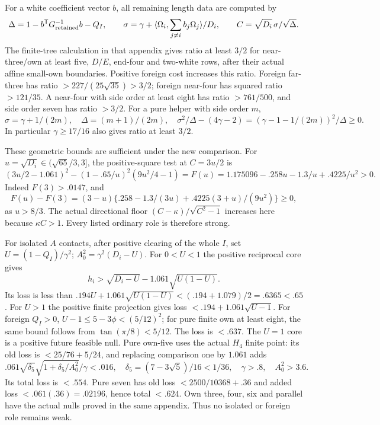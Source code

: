 \documentclass[11pt]{article}
\theoremstyle{definition}
\theoremstyle{remark}
\newcommand{\ip}[2]{\langle #1,#2\rangle}
\begin{document}
For a white coefficient vector \(b\), all remaining length data
are computed by
\[
 \Delta=1-b^\mathsf TG_{\rm retained}^{-1}b-Q_I,\qquad
 \sigma=\gamma+
  \ip{\Omega_i}{\sum_{j\ne i}b_j\Omega_j}/D_i,\qquad
 C=\sqrt{D_i}\,\sigma/\sqrt\Delta .
\]
The finite-tree calculation in that appendix gives ratio at least
\(3/2\) for near-three/own at least five, \(D/E\), end-four and
two-white rows, after their actual affine small-own boundaries.
Positive foreign cost increases this ratio.
Foreign far-three has ratio \(>227/(25\sqrt{35})>3/2\);
foreign near-four has squared ratio \(>121/35\).
A near-four with side order at least eight has ratio \(>761/500\),
and side order seven has ratio \(>3/2\).
For a pure helper with side order \(m\),
\[
 \sigma=\gamma+1/(2m),\quad \Delta=(m+1)/(2m),\quad
 \sigma^2/\Delta-(4\gamma-2)
 =(\gamma-1-1/(2m))^2/\Delta\geq0 .
\]
In particular \(\gamma\geq17/16\) also gives ratio at least \(3/2\).

These geometric bounds are sufficient under the new comparison.
For \(u=\sqrt{D_i}\in(\sqrt{65}/3,3]\), the positive-square test at
\(C=3u/2\) is
\[
 (3u/2-1.061)^2-(1-.65/u)^2(9u^2/4-1)
 =F(u)=1.175096-.258u-1.3/u+.4225/u^2>0 .
\]
Indeed \(F(3)>.0147\), and
\[
 F(u)-F(3)=(3-u)
 \{.258-1.3/(3u)+.4225(3+u)/(9u^2)\}\geq0,
\]
as \(u>8/3\). The actual directional floor
\((C-\kappa)/\sqrt{C^2-1}\) increases here because \(\kappa C>1\).
Every listed ordinary role is therefore strong.

For isolated \(A\) contacts, after positive clearing of the whole
\(I\), set \(U=(1-Q_I)/\gamma^2\);
\(A_0^2=\gamma^2(D_i-U)\).
For \(0<U<1\) the positive reciprocal core gives
\[
 h_i>\sqrt{D_i-U}-1.061\sqrt{U(1-U)}.
\]
Its loss is less than
\(.194U+1.061\sqrt{U(1-U)}
 <(.194+1.079)/2=.6365<.65\).
For \(U>1\) the positive finite projection gives loss
\(<.194+1.061\sqrt{U-1}\).
For foreign \(Q_I>0\), \(U-1\leq5-3\phi<(5/12)^2\);
for pure finite own at least eight, the same bound follows from
\(\tan(\pi/8)<5/12\). The loss is \(<.637\).
The \(U=1\) core is a positive future feasible null.
Pure own-five uses the actual \(H_4\) finite point:
its old loss is \(<25/76+5/24\), and replacing comparison one by
\(1.061\) adds
\[
 .061\sqrt{\delta_5}\sqrt{1+\delta_5/A_0^2}/\gamma<.016,
 \quad \delta_5=(7-3\sqrt5)/16<1/36,\quad
 \gamma>.8,\quad A_0^2>3.6 .
\]
Its total loss is \(<.554\).
Pure seven has old loss \(<2500/10368+.36\) and added loss
\(<.061(.36)=.02196\), hence total \(<.624\).
Own three, four, six and parallel have the actual nulls proved in
the same appendix. Thus no isolated or foreign role remains weak.
\end{document}
